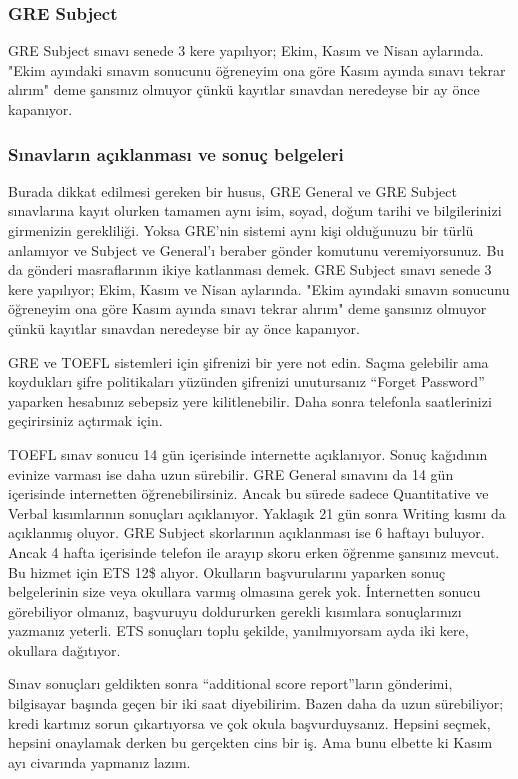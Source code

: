 \documentclass[12pt,a4paper]{article}
\begin{document}
\subsubsection{GRE Subject}
GRE Subject sınavı senede 3 kere yapılıyor; Ekim, Kasım ve Nisan aylarında. "Ekim ayındaki sınavın sonucunu öğreneyim ona göre Kasım ayında sınavı tekrar alırım" deme şansınız olmuyor çünkü kayıtlar sınavdan neredeyse bir ay önce kapanıyor. 


\subsubsection{Sınavların açıklanması ve sonuç belgeleri}
Burada dikkat edilmesi gereken bir husus, GRE General ve GRE Subject sınavlarına kayıt olurken tamamen aynı isim, soyad, doğum tarihi ve bilgilerinizi girmenizin gerekliliği. Yoksa GRE'nin sistemi aynı kişi olduğunuzu bir türlü anlamıyor ve Subject ve General'ı beraber gönder komutunu veremiyorsunuz. Bu da gönderi masraflarının ikiye katlanması demek. GRE Subject sınavı senede 3 kere yapılıyor; Ekim, Kasım ve Nisan aylarında. "Ekim ayındaki sınavın sonucunu öğreneyim ona göre Kasım ayında sınavı tekrar alırım" deme şansınız olmuyor çünkü kayıtlar sınavdan neredeyse bir ay önce kapanıyor. 


GRE ve TOEFL sistemleri için şifrenizi bir yere not edin. Saçma gelebilir ama koydukları şifre politikaları yüzünden şifrenizi unutursanız ``Forget Password'' yaparken hesabınız sebepsiz yere kilitlenebilir. Daha sonra telefonla saatlerinizi geçirirsiniz açtırmak için. 

TOEFL sınav sonucu 14 gün içerisinde internette açıklanıyor. Sonuç kağıdının evinize varması ise daha uzun sürebilir. GRE General sınavını da 14 gün içerisinde internetten öğrenebilirsiniz. Ancak bu sürede sadece Quantitative ve Verbal kısımlarının sonuçları açıklanıyor. Yaklaşık 21 gün sonra Writing kısmı da açıklanmış oluyor. GRE Subject skorlarının açıklanması ise 6 haftayı buluyor. Ancak 4 hafta içerisinde telefon ile arayıp skoru erken öğrenme şansınız mevcut. Bu hizmet için ETS 12\$ alıyor. Okulların başvurularını yaparken sonuç belgelerinin size veya okullara varmış olmasına gerek yok. İnternetten sonucu görebiliyor olmanız, başvuruyu doldururken gerekli kısımlara sonuçlarınızı yazmanız yeterli. ETS sonuçları toplu şekilde, yanılmıyorsam ayda iki kere, okullara dağıtıyor. 

Sınav sonuçları geldikten sonra ``additional score report''ların gönderimi, bilgisayar başında geçen bir iki saat diyebilirim. Bazen daha da uzun sürebiliyor; kredi kartınız sorun çıkartıyorsa ve çok okula başvurduysanız. Hepsini seçmek, hepsini onaylamak derken bu gerçekten cins bir iş. Ama bunu elbette ki Kasım ayı civarında yapmanız lazım. 
\end{document}
